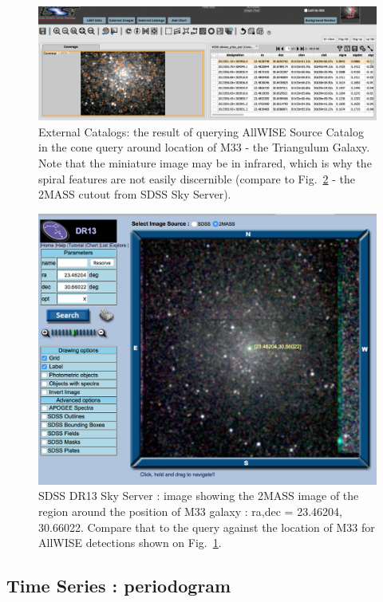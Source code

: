 \documentclass[DM,lsstdraft,toc,usenatbib]{lsstdoc}
\begin{document}
\begin{figure}
\includegraphics[width=\textwidth]{figs/external_catalogs_m33.png}
\caption{External Catalogs:  the result of querying AllWISE Source Catalog in the cone query around location of M33 - the Triangulum Galaxy.  Note that the miniature image may be in infrared, which is why the spiral features are not easily discernible (compare to Fig.~\ref{fig:skyserver_m33}  - the 2MASS cutout from SDSS Sky Server).  }
\label{fig:ext_catalogs_m33}
\end{figure}

\begin{figure}
\includegraphics[width=\textwidth]{figs/external_catalogs_m33_SkyServer.png}
\caption{SDSS DR13  Sky Server : image showing the 2MASS image of the region around the position of M33 galaxy : ra,dec = 23.46204, 30.66022.  Compare that to the query against the location of M33 for AllWISE detections shown on Fig.~\ref{fig:ext_catalogs_m33}. }
\label{fig:skyserver_m33}
\end{figure}


\subsection{Time Series : periodogram}
\label{sec:periodogram}
\end{document}
